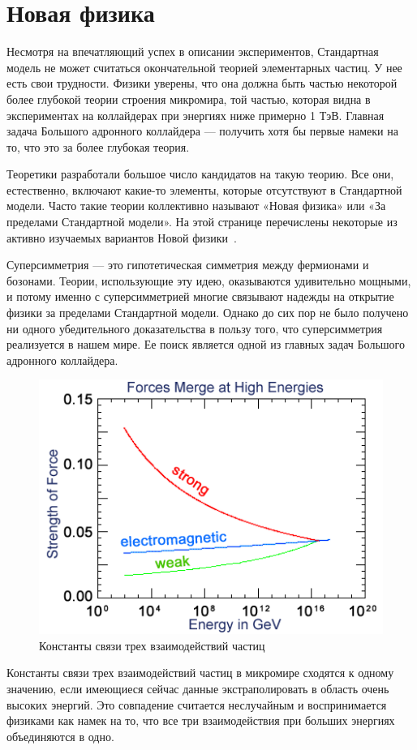 \section{Новая физика}

Несмотря на впечатляющий успех в описании экспериментов, Стандартная модель не может считаться окончательной теорией элементарных частиц. У нее есть свои трудности. Физики уверены, что она должна быть частью некоторой более глубокой теории строения микромира, той частью, которая видна в экспериментах на коллайдерах при энергиях ниже примерно 1 ТэВ. Главная задача Большого адронного коллайдера — получить хотя бы первые намеки на то, что это за более глубокая теория.

Теоретики разработали большое число кандидатов на такую теорию. Все они, естественно, включают какие-то элементы, которые отсутствуют в Стандартной модели. Часто такие теории коллективно называют «Новая физика» или «За пределами Стандартной модели». На этой странице перечислены некоторые из активно изучаемых вариантов Новой физики~\cite{2part-1}.

Суперсимметрия — это гипотетическая симметрия между фермионами и бозонами. Теории, использующие эту идею, оказываются удивительно мощными, и потому именно с суперсимметрией многие связывают надежды на открытие физики за пределами Стандартной модели. Однако до сих пор не было получено ни одного убедительного доказательства в пользу того, что суперсимметрия реализуется в нашем мире. Ее поиск является одной из главных задач Большого адронного коллайдера.
\begin{figure}[h]
	\centering
	\includegraphics[width=\textwidth]{figures/hep-sm.png}
	\caption{Константы связи трех взаимодействий частиц}
	\label{fig:fig01}
\end{figure}
Константы связи трех взаимодействий частиц в микромире сходятся к одному значению, если имеющиеся сейчас данные экстраполировать в область очень высоких энергий. Это совпадение считается неслучайным и воспринимается физиками как намек на то, что все три взаимодействия при больших энергиях объединяются в одно.

